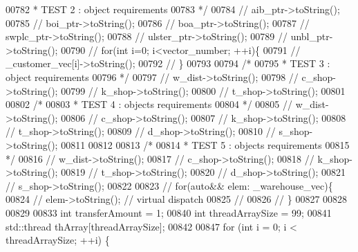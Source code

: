 \begin{DoxyCode}
00782 \textcolor{comment}{     * TEST 2 : object requirements }
00783 \textcolor{comment}{     */}
00784     \textcolor{comment}{//    aib\_ptr->toString();}
00785     \textcolor{comment}{//    boi\_ptr->toString();}
00786     \textcolor{comment}{//    boa\_ptr->toString();}
00787     \textcolor{comment}{//    swplc\_ptr->toString();}
00788     \textcolor{comment}{//    ulster\_ptr->toString();}
00789     \textcolor{comment}{//    unbl\_ptr->toString();}
00790     \textcolor{comment}{//    for(int i=0; i<vector\_number; ++i)\{}
00791     \textcolor{comment}{//        \_customer\_vec[i]->toString();}
00792     \textcolor{comment}{//    \}}
00793 
00794     \textcolor{comment}{/*}
00795 \textcolor{comment}{     * TEST 3 : object requirements}
00796 \textcolor{comment}{     */}
00797     \textcolor{comment}{//    w\_dist->toString();}
00798     \textcolor{comment}{//    c\_shop->toString();}
00799     \textcolor{comment}{//    k\_shop->toString();}
00800     \textcolor{comment}{//    t\_shop->toString();}
00801 
00802     \textcolor{comment}{/*}
00803 \textcolor{comment}{     * TEST 4 : objects requirements}
00804 \textcolor{comment}{     */}
00805     \textcolor{comment}{//        w\_dist->toString();}
00806     \textcolor{comment}{//        c\_shop->toString();}
00807     \textcolor{comment}{//        k\_shop->toString();}
00808     \textcolor{comment}{//        t\_shop->toString();}
00809     \textcolor{comment}{//        d\_shop->toString();}
00810     \textcolor{comment}{//        s\_shop->toString();}
00811 
00812 
00813     \textcolor{comment}{/*}
00814 \textcolor{comment}{     * TEST 5 : objects requirements}
00815 \textcolor{comment}{     */}
00816     \textcolor{comment}{//        w\_dist->toString();}
00817     \textcolor{comment}{//        c\_shop->toString();}
00818     \textcolor{comment}{//        k\_shop->toString();}
00819     \textcolor{comment}{//        t\_shop->toString();}
00820     \textcolor{comment}{//        d\_shop->toString();}
00821     \textcolor{comment}{//        s\_shop->toString();}
00822 
00823     \textcolor{comment}{//        for(auto&& elem: \_warehouse\_vec)\{}
00824     \textcolor{comment}{//            elem->toString(); // virtual dispatch}
00825     \textcolor{comment}{//            }
00826     \textcolor{comment}{//        \}}
00827 
00828 
00829 
00833     \textcolor{keywordtype}{int} transferAmount = 1;
00840     \textcolor{keywordtype}{int} threadArraySize = 99;
00841     std::thread thArray[threadArraySize];
00842 
00847     \textcolor{keywordflow}{for} (\textcolor{keywordtype}{int} i = 0; i < threadArraySize; ++i) \{

\end{DoxyCode}
